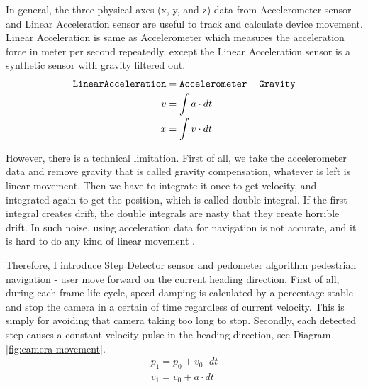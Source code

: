 In general, the three physical axes (x, y, and z) data from Accelerometer sensor and Linear Acceleration sensor are useful to track and calculate device movement. Linear Acceleration is same as Accelerometer which measures the acceleration force in meter per second repeatedly, except the Linear Acceleration sensor is a synthetic sensor with gravity filtered out. 
\[
\begin{array}{lr}
\begin{aligned}
\texttt{LinearAcceleration} &= \texttt{Accelerometer} - \texttt{Gravity}\\
v &= \int a \cdot dt\\
x &= \int v \cdot dt\\
\end{aligned}
\end{array}
\]

However, there is a technical limitation. First of all, we take the accelerometer data and remove gravity that is called gravity compensation, whatever is left is linear movement. Then we have to integrate it once to get velocity, and integrated again to get the position, which is called double integral. If the first integral creates drift, the double integrals are nasty that they create horrible drift. In such noise, using acceleration data for navigation is not accurate, and it is hard to do any kind of linear movement \cite{google.sensor-fusion.2010}.

Therefore, I introduce Step Detector sensor and pedometer algorithm pedestrian navigation - user move forward on the current heading direction. First of all, during each frame life cycle, speed damping is calculated by a percentage stable and stop the camera in a certain of time regardless of current velocity. This is simply for avoiding that camera taking too long to stop. Secondly, each detected step causes a constant velocity pulse in the heading direction, see Diagram \ref{fig:camera-movement}.
\[
\begin{array}{lr}
p_1 = p_0 + v_0 \cdot dt\\
v_1 = v_0 + a \cdot dt\\
\end{array}
\]

